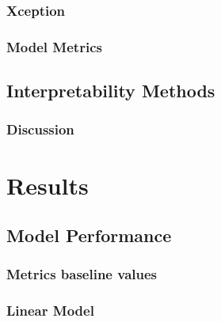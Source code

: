 \documentclass[biblatexBackend=bibtex]{tumthesis}
\begin{document}
\subsection{Xception}
\label{sec:methodology:XC}


\subsection{Model Metrics}
\label{sec:methodology:metrics}


\section{Interpretability Methods}
\label{sec:methodology:interpretability_methods}



\subsection{Discussion}
\label{sec:methodology:discussion}


\chapter{Results}
\label{ch:results}


\section{Model Performance}
\label{sec:model_performance}
%

\subsection{Metrics baseline values}
\label{sec:results:bl_values}


\subsection{Linear Model}
\label{sec:results:lm}
\end{document}
